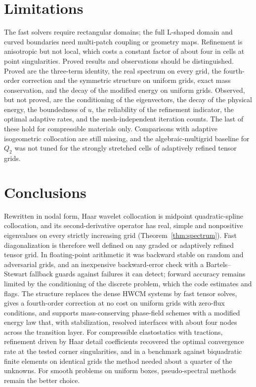 \documentclass[smallextended,envcountsame]{svjour3}
\begin{document}
\section{Limitations}\label{sec:limits}
The fast solvers require rectangular domains; the full L-shaped domain and curved boundaries need
multi-patch coupling or geometry maps. Refinement is anisotropic but not local, which costs a constant
factor of about four in cells at point singularities. Proved results and observations should be
distinguished. Proved are the three-term identity, the real spectrum on every grid, the fourth-order
correction and the symmetric structure on uniform grids, exact mass conservation, and the decay of the
modified energy on uniform grids. Observed, but not proved, are the conditioning of the eigenvectors, the
decay of the physical energy, the boundedness of $u$, the reliability of the refinement indicator, the
optimal adaptive rates, and the mesh-independent iteration counts. The last of these hold for compressible
materials only. Comparisons with adaptive isogeometric collocation are still missing, and the algebraic-multigrid
baseline for $Q_2$ was not tuned for the strongly stretched cells of adaptively refined tensor grids.

\section{Conclusions}
Rewritten in nodal form, Haar wavelet collocation is midpoint quadratic-spline collocation, and its
second-derivative operator has real, simple and nonpositive eigenvalues on every strictly increasing grid
(Theorem~\ref{thm:spectrum}). Fast diagonalization is therefore well defined on any graded or adaptively
refined tensor grid. In floating-point arithmetic it was backward stable on random and adversarial grids,
and an inexpensive backward-error check with a Bartels--Stewart fallback guards against failures it can
detect; forward accuracy remains limited by the conditioning of the discrete problem, which the code
estimates and flags. The structure replaces the dense HWCM systems by fast tensor solves, gives a
fourth-order correction at no cost on uniform grids with zero-flux conditions, and supports
mass-conserving phase-field schemes with a modified energy law that, with stabilization, resolved
interfaces with about four nodes across the transition layer. For compressible elastostatics with
tractions, refinement driven by Haar detail coefficients recovered the optimal convergence rate at the
tested corner singularities, and in a benchmark against biquadratic finite elements on identical grids the
method needed about a quarter of the unknowns. For smooth problems on uniform boxes, pseudo-spectral
methods remain the better choice.
\end{document}
